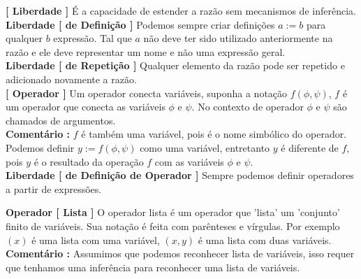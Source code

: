 \documentclass[10pt,a4paper]{report}
\begin{document}

\hspace{\baselineskip}

\textbf{[ Liberdade ]} É a capacidade de estender a razão sem mecanismos de inferência.\\

\textbf{Liberdade [ de Definição ]} Podemos sempre criar definições $a := b$ para qualquer $b$ expressão. Tal que $a$ não deve ter sido utilizado anteriormente na razão e ele deve representar um nome e não uma expressão geral.\\

\textbf{Liberdade [ de Repetição ]} Qualquer elemento da razão pode ser repetido e adicionado novamente a razão.\\

\textbf{[ Operador ]} Um operador conecta variáveis, suponha a notação $f(\phi,\psi)$, $f$ é um operador que conecta as variáveis $\phi$ e $\psi$. No contexto de operador $\phi$ e $\psi$ são chamados de argumentos. \\

\textbf{Comentário :} $f$ é também uma variável, pois é o nome simbólico do operador. Podemos definir $y := f(\phi, \psi)$ como uma variável, entretanto $y$ é diferente de $f$, pois $y$ é o resultado da operação $f$ com as variáveis $\phi$ e $\psi$.\\

\textbf{Liberdade [ de Definição de Operador ]} Sempre podemos definir operadores a partir de expressões.



\hspace{\baselineskip}

\textbf{Operador [ Lista ]} O operador lista é um operador que 'lista' um 'conjunto' finito de variáveis. Sua notação é feita com parênteses e vírgulas. Por exemplo $(x)$ é uma lista com uma variável, $(x,y) $ é uma lista com duas variáveis.\\

\textbf{Comentário :} Assumimos que podemos reconhecer lista de variáveis, isso requer que tenhamos uma inferência para reconhecer uma lista de variáveis.\\
\end{document}

